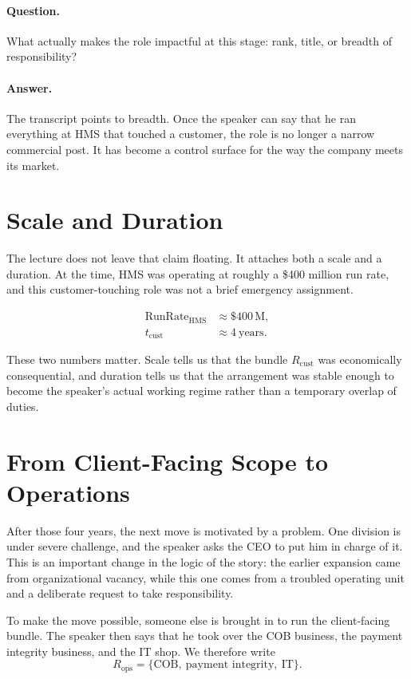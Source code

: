 \paragraph{Question.}
What actually makes the role impactful at this stage: rank, title, or breadth of responsibility?

\paragraph{Answer.}
The transcript points to breadth. Once the speaker can say that he ran everything at HMS that touched a customer, the role is no longer a narrow commercial post. It has become a control surface for the way the company meets its market.

\section{Scale and Duration}

The lecture does not leave that claim floating. It attaches both a scale and a duration. At the time, HMS was operating at roughly a \$400 million run rate, and this customer-touching role was not a brief emergency assignment.

\begin{align}
\mathrm{RunRate}_{\mathrm{HMS}} &\approx \$400\,\mathrm{M},\\
t_{\mathrm{cust}} &\approx 4\ \text{years}.
\end{align}

These two numbers matter. Scale tells us that the bundle \(R_{\mathrm{cust}}\) was economically consequential, and duration tells us that the arrangement was stable enough to become the speaker's actual working regime rather than a temporary overlap of duties.

\section{From Client-Facing Scope to Operations}

After those four years, the next move is motivated by a problem. One division is under severe challenge, and the speaker asks the CEO to put him in charge of it. This is an important change in the logic of the story: the earlier expansion came from organizational vacancy, while this one comes from a troubled operating unit and a deliberate request to take responsibility.

To make the move possible, someone else is brought in to run the client-facing bundle. The speaker then says that he took over the COB business, the payment integrity business, and the IT shop. We therefore write
\begin{equation}
R_{\mathrm{ops}} = \{\text{COB},\ \text{payment integrity},\ \text{IT}\}.
\end{equation}

